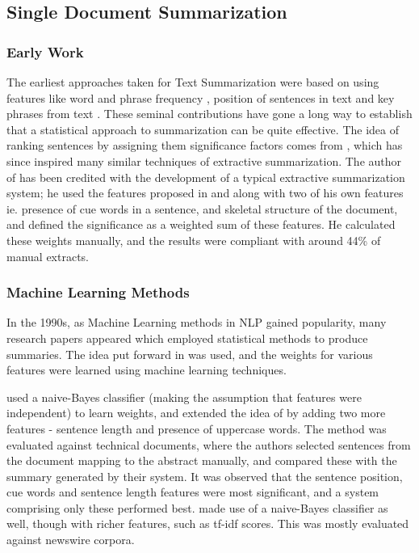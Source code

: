 \documentclass[BTech]{nitgoathesis}
\begin{document}
\subsection{Single Document Summarization}
\subsubsection{Early Work}
The earliest approaches taken for Text Summarization were based on using features like word and phrase frequency \cite{lun}, position of sentences in text \cite{bax} and key phrases from text \cite{edm}. These seminal contributions have gone a long way to establish that a statistical approach to summarization can be quite effective. The idea of ranking sentences by assigning them significance factors comes from \cite{lun}, which has since inspired many similar techniques of extractive summarization. The author of \cite{edm} has been credited with the development of a typical extractive summarization system; he used the features proposed in \cite{lun} and \cite{bax} along with two of his own features ie. presence of cue words in a sentence, and skeletal structure of the document, and defined the significance as a weighted sum of these features. He calculated these weights manually, and the results were compliant with around 44\% of manual extracts.

\subsubsection{Machine Learning Methods}

In the 1990s, as Machine Learning methods in NLP gained popularity, many research papers appeared which employed statistical methods to produce summaries. The idea put forward in \cite{edm} was used, and the weights for various features were learned using machine learning techniques.
\par
\cite{kup} used a naive-Bayes classifier (making the assumption that features were independent) to learn weights, and extended the idea of \cite{edm} by adding two more features - sentence length and presence of uppercase words. The method was evaluated against technical documents, where the authors selected sentences from the document mapping to the abstract manually, and compared these with the summary generated by their system. It was observed that the sentence position, cue words and sentence length features were most significant, and a system comprising only these performed best.
\cite{aone} made use of a naive-Bayes classifier as well, though with richer features, such as tf-idf scores. This was mostly evaluated against newswire corpora.
\end{document}
